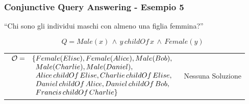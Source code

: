 \documentclass[8pt]{beamer}
\begin{document}
\begin{frame}
\frametitle{Conjunctive Query Answering - Esempio 5}
\begin{center}
``Chi sono gli individui maschi con almeno una figlia femmina?''
\end{center}
\[
 Q=Male(x)\,\wedge\,y\,childOf\,x\,\wedge\,Female(y)
\]
\vspace{\baselineskip}

\begin{tabular}{lc}
$\begin{array}{cl}
  \Ont  =  &  \{Female(Elise), Female(Alice), Male(Bob), \\
  &\phantom{\{}Male(Charlie), Male(Daniel), \\
  &\phantom{\{}Alice\,childOf\,Elise, Charlie\,childOf\,Elise, \\
  &\phantom{\{}Daniel\,childOf\,Alice, Daniel\,childOf\,Bob, \\
  &\phantom{\{}Francis\,childOf\,Charlie \}\\
\end{array}$ & Nessuna Soluzione\\
\end{tabular}
\end{frame}
\end{document}

